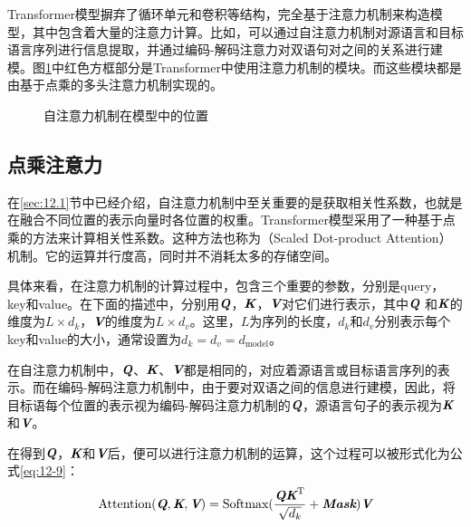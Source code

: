 \parinterval Transformer模型摒弃了循环单元和卷积等结构，完全基于注意力机制来构造模型，其中包含着大量的注意力计算。比如，可以通过自注意力机制对源语言和目标语言序列进行信息提取，并通过编码-解码注意力对双语句对之间的关系进行建模。图\ref{fig:12-9}中红色方框部分是Transformer中使用注意力机制的模块。而这些模块都是由基于点乘的多头注意力机制实现的。

\begin{figure}[htp]
\centering

\caption{自注意力机制在模型中的位置}
\label{fig:12-9}
\end{figure}


\subsection{点乘注意力}

\parinterval 在\ref{sec:12.1}节中已经介绍，自注意力机制中至关重要的是获取相关性系数，也就是在融合不同位置的表示向量时各位置的权重。Transformer模型采用了一种基于点乘的方法来计算相关性系数。这种方法也称为{\small{}}（Scaled Dot-product Attention）机制。它的运算并行度高，同时并不消耗太多的存储空间。

\parinterval 具体来看，在注意力机制的计算过程中，包含三个重要的参数，分别是query，\\key和value。在下面的描述中，分别用$\textbf{\em Q}$，$\textbf{\em K}$，$\textbf{\em V}$对它们进行表示，其中$\textbf{\em Q}$ 和$\textbf{\em K}$的维度为$L\times d_k$，$\textbf{\em V}$的维度为$L\times d_v$。这里，$L$为序列的长度，$d_k$和$d_v$分别表示每个key和value的大小，通常设置为$d_k=d_v=d_{\textrm{model}}$。

\parinterval 在自注意力机制中，$\textbf{\em Q}$、$\textbf{\em K}$、$\textbf{\em V}$都是相同的，对应着源语言或目标语言序列的表示。而在编码-解码注意力机制中，由于要对双语之间的信息进行建模，因此，将目标语每个位置的表示视为编码-解码注意力机制的$\textbf{\em Q}$，源语言句子的表示视为$\textbf{\em K}$ 和$\textbf{\em V}$。

\parinterval 在得到$\textbf{\em Q}$，$\textbf{\em K}$和$\textbf{\em V}$后，便可以进行注意力机制的运算，这个过程可以被形式化为公式\eqref{eq:12-9}：
\begin{eqnarray}
\textrm{Attention}(\textbf{\em Q},\textbf{\em K},\textbf{\em V}) = \textrm{Softmax}
 ( \frac{\textbf{\em Q}\textbf{\em K}^{\textrm{T}}} {\sqrt{d_k}} + \textbf{\em Mask} ) \textbf{\em V}
\label{eq:12-9}
\end{eqnarray}

